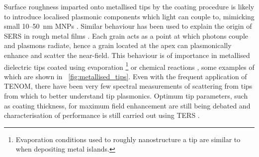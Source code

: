 \documentclass{article}
\begin{document}
Surface roughness imparted onto metallised tips by the coating procedure is likely to introduce localised plasmonic components which light can couple to, mimicking small 10--\SI{50}{nm} MNPs \cite{mino2014}. Similar behaviour has been used to explain the origin of SERS in rough metal films \cite{fleischmann1974, jeanmaire1977}. Each grain acts as a point at which photons couple and plasmons radiate, hence a grain located at the apex can plasmonically enhance and scatter the near-field. This behaviour is of importance in metallised dielectric tips coated using evaporation%
\footnote{Evaporation conditions used to roughly nanostructure a tip are similar to when depositing metal islands.}
\cite{hayazawa2001, hayazawa2012, mino2014} or chemical reactions \cite{bailo2008}, some examples of which are shown in \figurename~\ref{fig:metallised_tips}. Even with the frequent application of TENOM, there have been very few spectral measurements of scattering from tips from which to better understand tip plasmonics. Optimum tip parameters, such as coating thickness, for maximum field enhancement are still being debated and characterisation of performance is still carried out using TERS \cite{meng2015}.
\end{document}
